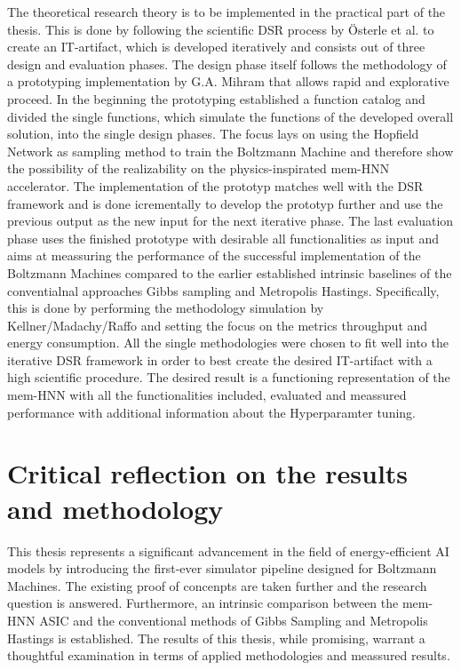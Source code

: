 The theoretical research theory is to be implemented in the practical part of the thesis.
This is done by following the scientific \ac{DSR} process by Österle et al. to create an \ac{IT}-artifact,
which is developed iteratively and consists out of three design and evaluation phases. 
The design phase itself follows the methodology of a prototyping implementation by G.A. Mihram that allows rapid and explorative proceed.
In the beginning the prototyping established a function catalog and divided the single functions, 
which simulate the functions of the developed overall solution, into the single design phases. 
The focus lays on using the Hopfield Network as sampling method to train the Boltzmann Machine
and therefore show the possibility of the realizability on the physics-inspirated \ac{mem-HNN} accelerator.
The implementation of the prototyp matches well with the \ac{DSR} framework and is done icrementally to develop the prototyp further and use the previous output as
the new input for the next iterative phase.   
The last evaluation phase uses the finished prototype with desirable all functionalities as input and 
aims at meassuring the performance of the successful implementation of the Boltzmann Machines compared to the earlier established intrinsic baselines
of the conventialnal approaches Gibbs sampling and Metropolis Hastings.
Specifically, this is done by performing the methodology simulation by Kellner/Madachy/Raffo and setting the focus on 
the metrics throughput and energy consumption. 
All the single methodologies were chosen to fit well into the iterative \ac{DSR} framework in order to best 
create the desired \ac{IT}-artifact with a high scientific procedure.
The desired result is a functioning representation of the \ac{mem-HNN} with all the functionalities included, 
evaluated and meassured performance with additional information about the Hyperparamter tuning.

\section{Critical reflection on the results and methodology}

This thesis represents a significant advancement in the field of energy-efficient AI models by introducing the first-ever simulator pipeline designed for Boltzmann Machines.
The existing proof of concenpts are taken further and the research question is answered.
Furthermore, an intrinsic comparison between the \ac{mem-HNN} \ac{ASIC} and the conventional methods of Gibbs Sampling and Metropolis Hastings is established.
The results of this thesis, while promising, warrant a thoughtful examination in terms of applied methodologies and meassured results.

